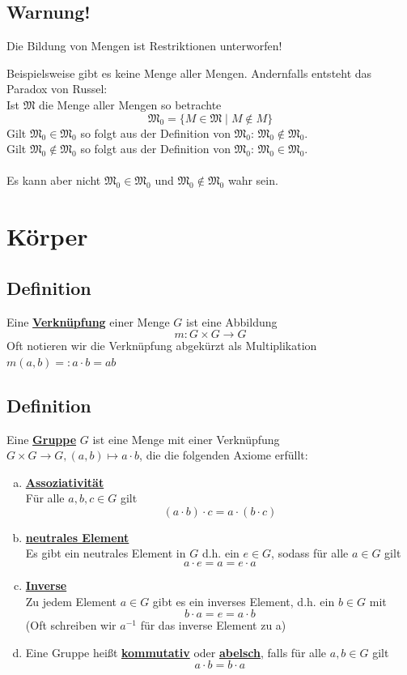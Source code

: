 \subsection{Warnung!}
\centerline{Die Bildung von Mengen ist Restriktionen unterworfen!} 
\vspace{\baselineskip}
Beispielsweise gibt es keine Menge aller Mengen. Andernfalls entsteht das Paradox von Russel: \\
Ist \(\mathfrak{M}\) die Menge aller Mengen so betrachte
\[
\mathfrak{M}_0 = \{ M \in \mathfrak{M} \mid M \not\in M\}
\]
Gilt \( \mathfrak{M}_0 \in \mathfrak{M}_0\) so folgt aus der Definition von  \( \mathfrak{M}_0 \): \quad \(\mathfrak{M}_0 \not\in \mathfrak{M}_0\). \\
Gilt \( \mathfrak{M}_0 \not\in \mathfrak{M}_0\) so folgt aus der Definition von  \( \mathfrak{M}_0 \): \quad \(\mathfrak{M}_0 \in \mathfrak{M}_0\). \\
\\
Es kann aber nicht \( \mathfrak{M}_0 \in \mathfrak{M}_0\) und \( \mathfrak{M}_0 \not\in \mathfrak{M}_0\) wahr sein.

\newpage
\section{Körper}

\subsection{Definition}
Eine \underline{\textbf{Verknüpfung}} einer Menge \(G\) ist eine Abbildung
\[
m: G \times G \rightarrow G
\]
Oft notieren wir die Verknüpfung abgekürzt als Multiplikation \(m(a,b) =: a \cdot b = ab\)

\subsection{Definition}
Eine \underline{\textbf{Gruppe}} \(G\) ist eine Menge mit einer Verknüpfung \(G \times G \rightarrow G, (a,b) \mapsto a \cdot b \), die die folgenden Axiome erfüllt:
\begin{enumerate}[(a)]
\item \underline{\textbf{Assoziativität}} \\
Für alle \(a,b,c \in G\) gilt 
\[
(a \cdot b) \cdot c = a \cdot (b \cdot c)
\]

\item \underline{\textbf{neutrales Element}} \\
Es gibt ein neutrales Element in \(G\) d.h. ein \(e \in G\), sodass für alle \(a \in G \) gilt
\[
a \cdot e = a = e \cdot a
\]

\item \underline{\textbf{Inverse}} \\
Zu jedem Element \(a \in G\) gibt es ein inverses Element, d.h. ein \(b \in G\) mit 
\[
b \cdot a = e = a \cdot b
\]
(Oft schreiben wir \(a^{-1}\) für das inverse Element zu a)
\item Eine Gruppe heißt \underline{\textbf{kommutativ}} oder \underline{\textbf{abelsch}}, falls für alle \(a,b \in G\) gilt
\[
a \cdot b = b \cdot a
\]
\end{enumerate}

